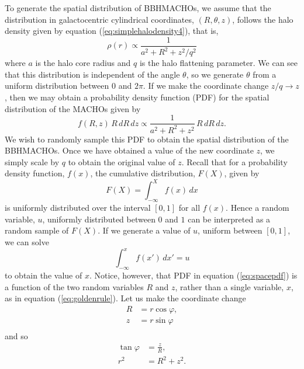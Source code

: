 To generate the spatial distribution of BBHMACHOs, we assume that the
distribution in galactocentric cylindrical coordinates, $(R,\theta,z)$,
follows the halo density given by equation (\ref{eq:simplehalodensity4}),
that is,
\begin{equation}
\rho(r) \propto \frac{1}{a^2 + R^2 + z^2/q^2}
\end{equation}
where $a$ is the halo core radius and $q$ is the halo flattening parameter. We
can see that this distribution is independent of the angle $\theta$, so we
generate $\theta$ from a uniform distribution between $0$ and $2\pi$.  If
we make the coordinate change $z/q \rightarrow z$, then we may obtain a
probability density function (PDF) for the spatial distribution of
the MACHOs given by
\begin{equation}
f(R,z)\,R\, dR\, dz \propto \frac{1}{a^2 + R^2 + z^2}\,R\, dR\, dz.
\label{eq:spacepdf}
\end{equation}
We wish to randomly sample this PDF to obtain the spatial distribution of
the BBHMACHOs. Once we have obtained a value of the new coordinate $z$, we
simply scale by $q$ to obtain the original value of $z$. Recall that for a
probability density function, $f(x)$, the cumulative distribution, $F(X)$,
given by
\begin{equation}
F(X) = \int_{-\infty}^X f(x)\, dx
\end{equation}
is uniformly distributed over the interval $[0,1]$ for all $f(x)$. Hence a
random variable, $u$, uniformly distributed between $0$ and $1$ can be
interpreted as a random sample of $F(X)$. If we generate a value of $u$,
uniform between $[0,1]$, we can solve 
\begin{equation}
\int_{-\infty}^x f(x')\, dx' = u
\label{eq:goldenrule}
\end{equation}
to obtain the value of $x$. Notice, however, that PDF in equation
(\ref{eq:spacepdf}) is a function of the two random variables $R$ and $z$,
rather than a single variable, $x$, as in equation (\ref{eq:goldenrule}).
Let us make the coordinate change
\begin{equation}
\begin{split}
R &= r \cos \varphi, \\
z &= r \sin \varphi \\
\label{eq:probcoordtrans}
\end{split}
\end{equation}
and so
\begin{equation}
\begin{split}
\tan \varphi &= \frac{z}{R}, \\
r^2 &= R^2 + z^2. \\
\end{split}
\end{equation}
